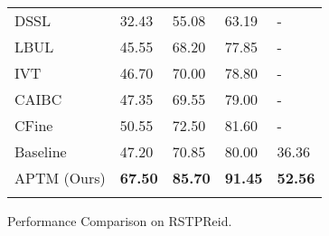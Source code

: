 \documentclass[sigconf]{acmart}
\begin{document}
\begin{figure*}
\begin{minipage}[t]{0.45\linewidth}
\begin{minipage}[t]{1.0\linewidth}
{\begin{tabular}[h!]{p{3cm}|m{1.2cm}<{\centering}m{1.2cm}<{\centering}m{1.2cm}<{\centering}m{1.2cm}<{\centering}}
                \hline
                DSSL~\cite{zhu2021dssl} & 32.43 & 55.08 & 63.19 & - \\
                LBUL~\cite{wang2022look} & 45.55 & 68.20 & 77.85 & - \\
                IVT~\cite{shu2023see} & 46.70 & 70.00 &	78.80 & - \\
                CAIBC~\cite{wang2022caibc} & 47.35 & 69.55  & 79.00 & - \\
                CFine~\cite{yan2022clip} & 50.55 & 72.50 & 81.60 & - \\
                \hline
                Baseline & 47.20 & 70.85 & 80.00 & 36.36 \\ 
                APTM (Ours) & \textbf{ 67.50} & \textbf{85.70} & \textbf{91.45} & \textbf{52.56}\\
                \shline
            \end{tabular}
        }
        \vspace{-0.3cm}
        \caption{Performance Comparison on RSTPReid.} 
        \vspace{0.4cm}
        \label{tab:sota_RSTP}
    \end{minipage}
    

\end{minipage}
\end{figure*}
\end{document}
